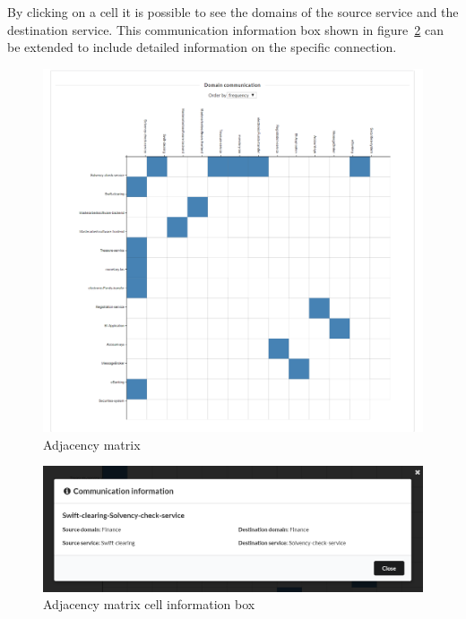 By clicking on a cell it is possible to see the domains of the source service  and the destination service. This communication information box shown in figure~\ref{fig:pivio-visualizations-adjacency-matrix-cell} can be extended to include detailed information on the specific connection.

\begin{figure}[htpb]
  \centering
  \includegraphics[width=1.0\textwidth]{figures/pivio-visualizations-matrix.png}
  \caption{Adjacency matrix}
  \label{fig:pivio-visualizations-adjacency-matrix}
\end{figure}

\begin{figure}[htpb]
  \centering
  \includegraphics[width=1.0\textwidth]{figures/pivio-visualizations-matrix-cell.PNG}
  \caption{Adjacency matrix cell information box}
  \label{fig:pivio-visualizations-adjacency-matrix-cell}
\end{figure}

